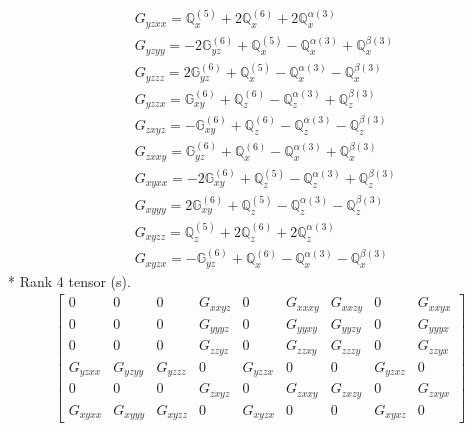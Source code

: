 \documentclass[fleqn,8pt,landscape]{jsarticle}
\begin{document}
\begin{align*}
& G_{yzxx} = \mathbb{Q}_{x}^{(5)} + 2 \mathbb{Q}_{x}^{(6)} + 2 \mathbb{Q}_{x}^{\alpha(3)} \\
& G_{yzyy} = - 2 \mathbb{G}_{yz}^{(6)} + \mathbb{Q}_{x}^{(5)} - \mathbb{Q}_{x}^{\alpha(3)} + \mathbb{Q}_{x}^{\beta(3)} \\
& G_{yzzz} = 2 \mathbb{G}_{yz}^{(6)} + \mathbb{Q}_{x}^{(5)} - \mathbb{Q}_{x}^{\alpha(3)} - \mathbb{Q}_{x}^{\beta(3)} \\
& G_{yzzx} = \mathbb{G}_{xy}^{(6)} + \mathbb{Q}_{z}^{(6)} - \mathbb{Q}_{z}^{\alpha(3)} + \mathbb{Q}_{z}^{\beta(3)} \\
& G_{zxyz} = - \mathbb{G}_{xy}^{(6)} + \mathbb{Q}_{z}^{(6)} - \mathbb{Q}_{z}^{\alpha(3)} - \mathbb{Q}_{z}^{\beta(3)} \\
& G_{zxxy} = \mathbb{G}_{yz}^{(6)} + \mathbb{Q}_{x}^{(6)} - \mathbb{Q}_{x}^{\alpha(3)} + \mathbb{Q}_{x}^{\beta(3)} \\
& G_{xyxx} = - 2 \mathbb{G}_{xy}^{(6)} + \mathbb{Q}_{z}^{(5)} - \mathbb{Q}_{z}^{\alpha(3)} + \mathbb{Q}_{z}^{\beta(3)} \\
& G_{xyyy} = 2 \mathbb{G}_{xy}^{(6)} + \mathbb{Q}_{z}^{(5)} - \mathbb{Q}_{z}^{\alpha(3)} - \mathbb{Q}_{z}^{\beta(3)} \\
& G_{xyzz} = \mathbb{Q}_{z}^{(5)} + 2 \mathbb{Q}_{z}^{(6)} + 2 \mathbb{Q}_{z}^{\alpha(3)} \\
& G_{xyzx} = - \mathbb{G}_{yz}^{(6)} + \mathbb{Q}_{x}^{(6)} - \mathbb{Q}_{x}^{\alpha(3)} - \mathbb{Q}_{x}^{\beta(3)}
\end{align*}
* Rank 4 tensor (s).
\begin{align*}
\begin{bmatrix} 0 & 0 & 0 & G_{xxyz} & 0 & G_{xxxy} & G_{xxzy} & 0 & G_{xxyx} \\ 0 & 0 & 0 & G_{yyyz} & 0 & G_{yyxy} & G_{yyzy} & 0 & G_{yyyx} \\ 0 & 0 & 0 & G_{zzyz} & 0 & G_{zzxy} & G_{zzzy} & 0 & G_{zzyx} \\ G_{yzxx} & G_{yzyy} & G_{yzzz} & 0 & G_{yzzx} & 0 & 0 & G_{yzxz} & 0 \\ 0 & 0 & 0 & G_{zxyz} & 0 & G_{zxxy} & G_{zxzy} & 0 & G_{zxyx} \\ G_{xyxx} & G_{xyyy} & G_{xyzz} & 0 & G_{xyzx} & 0 & 0 & G_{xyxz} & 0 \end{bmatrix}
\end{align*}
\end{document}
